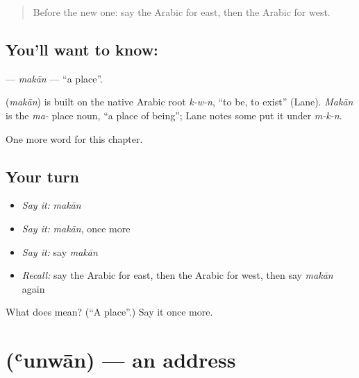 \label{lesson:AR-C104-makan}



\begin{quote}
Before the new one: say the Arabic for east, then the Arabic for west.
\end{quote}

\subsection*{You'll want to know: }
\textbf{} — \emph{makān} — \textquotedblleft{}a place\textquotedblright{}.

\begin{cousinweb}
\textbf{} (\emph{makān}) is built on the native Arabic root \emph{k-w-n}, \textquotedblleft{}to be, to exist\textquotedblright{} (Lane). \emph{Makān} is the \emph{ma-} place noun, \textquotedblleft{}a place of being\textquotedblright{}; Lane notes some put it under \emph{m-k-n}.
\end{cousinweb}

\begin{grammarlens}[title={What you've built}]
One more word for this chapter.
\end{grammarlens}

\subsection*{Your turn}
\begin{itemize}
\raggedright
  \item \emph{Say it:} \emph{makān}
  \item \emph{Say it:} \emph{makān}, once more
  \item \emph{Say it:} say \emph{makān}
  \item \emph{Recall:} say the Arabic for east, then the Arabic for west, then say \emph{makān} again
\end{itemize}

\begin{tcolorbox}[breakable,colback=teal!4,colframe=teal!35!black,title={Before you move on}]
What does  mean? (\textquotedblleft{}A place\textquotedblright{}.) Say it once more.
\end{tcolorbox}
\section[\texorpdfstring{\ar{عنوان} (ʿunwān)}{عنوان (ʿunwān)}]{ (ʿunwān) — an address}

